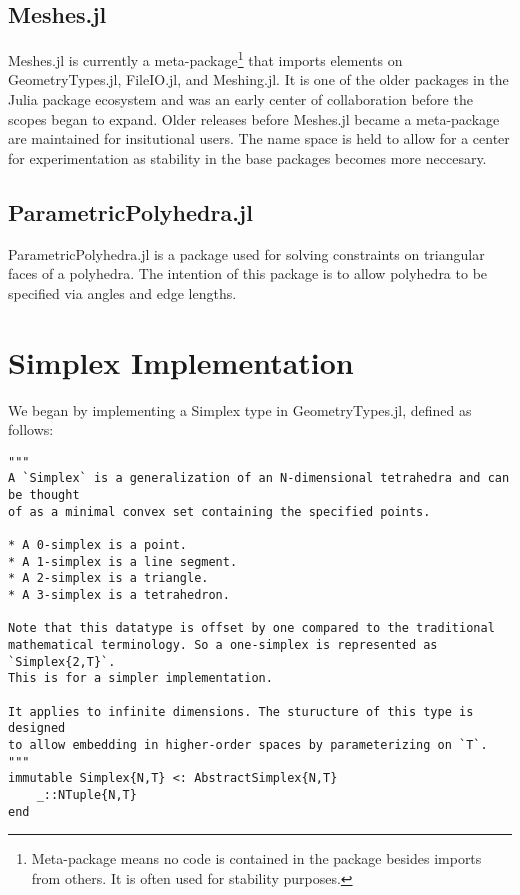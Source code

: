 \subsection{Meshes.jl}

Meshes.jl is currently a meta-package\footnote{Meta-package means
no code is contained in the package besides imports from others. It is
often used for stability purposes.} that imports elements on GeometryTypes.jl,
FileIO.jl, and Meshing.jl. It is one of the older packages in the
Julia package ecosystem and was an early center of collaboration before
the scopes began to expand. Older releases before Meshes.jl became a meta-package 
are maintained for insitutional users. The name space is held to
allow for a center for experimentation as stability in the base packages
becomes more neccesary.

\subsection{ParametricPolyhedra.jl}

ParametricPolyhedra.jl is a package used for solving constraints on
triangular faces of a polyhedra. The intention of this package
is to allow polyhedra to be specified via angles and edge lengths.


\section{Simplex Implementation}

We began by implementing a Simplex type in GeometryTypes.jl,
defined as follows:

\begin{lstlisting}
"""
A `Simplex` is a generalization of an N-dimensional tetrahedra and can be thought
of as a minimal convex set containing the specified points.

* A 0-simplex is a point.
* A 1-simplex is a line segment.
* A 2-simplex is a triangle.
* A 3-simplex is a tetrahedron.

Note that this datatype is offset by one compared to the traditional
mathematical terminology. So a one-simplex is represented as `Simplex{2,T}`.
This is for a simpler implementation.

It applies to infinite dimensions. The sturucture of this type is designed
to allow embedding in higher-order spaces by parameterizing on `T`.
"""
immutable Simplex{N,T} <: AbstractSimplex{N,T}
    _::NTuple{N,T}
end
\end{lstlisting}

